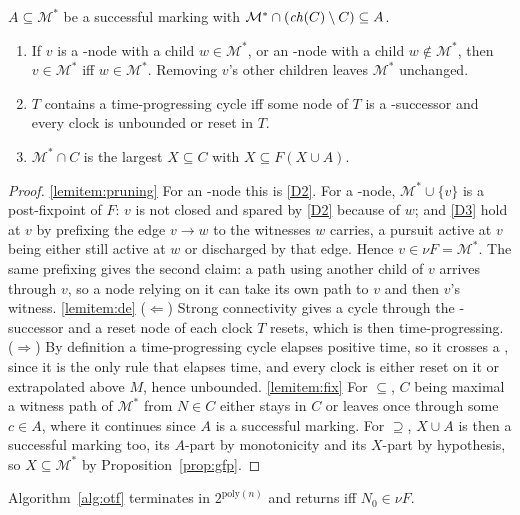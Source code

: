 \begin{lemma}\label{lem:search}
$A\subseteq\mathcal M^{*}$ be a successful marking with $\mathcal M^{*}\cap(\mathit{ch}(C)\setminus C)\subseteq A$.
\begin{enumerate}[label=\emph{(\roman*)}, ref={(\roman*)}]
\item\label{lemitem:pruning} If $v$ is a \ORn-node with a child $w\in\mathcal M^{*}$, or an
\ANDn-node with a child $w\notin\mathcal M^{*}$, then $v\in\mathcal M^{*}$ iff
$w\in\mathcal M^{*}$. Removing $v$'s other children leaves $\mathcal M^{*}$ unchanged.
\item\label{lemitem:de} $T$ contains a time-progressing cycle iff some node of $T$ is a
-successor and every clock is unbounded or reset in $T$.
\item\label{lemitem:fix} $\mathcal M^{*}\cap C$ is the largest $X\subseteq C$ with
$X\subseteq F(X\cup A)$.
\end{enumerate}
\end{lemma}
\begin{proof}
\ref{lemitem:pruning} For an \ANDn-node this is \ref{D2}. For a \ORn-node, $\mathcal M^{*}\cup\{v\}$
is a post-fixpoint of $F$: $v$ is not closed and spared by \ref{D2} because of $w$; and \ref{D3} hold at $v$ by prefixing the edge
$v\to w$ to the witnesses $w$ carries, a pursuit active at $v$ being either still active at $w$ or
discharged by that edge. Hence $v\in\nu F=\mathcal M^{*}$. The same prefixing gives the second
claim: a path using another child of $v$ arrives through $v$, so a node relying on it can take its
own path to $v$ and then $v$'s witness. \ref{lemitem:de} ($\Leftarrow$) Strong connectivity gives a cycle through the
-successor and a reset node of each clock $T$ resets, which is then
time-progressing. ($\Rightarrow$) By definition a time-progressing cycle elapses positive time, so it crosses a , since it is the only rule that elapses time, and every clock is either reset on it or extrapolated above $M$, hence unbounded. 
\ref{lemitem:fix} For $\subseteq$, $C$ being maximal a witness path of $\mathcal M^{*}$ from
$N\in C$ either stays in $C$ or leaves once through some $c\in A$, where it continues since $A$ is a
successful marking. For $\supseteq$, $X\cup A$ is then a successful marking too, its $A$-part by
monotonicity and its $X$-part by hypothesis, so $X\subseteq\mathcal M^{*}$ by
Proposition~\ref{prop:gfp}.
\end{proof}

\begin{theorem}\label{thm:alg}
Algorithm~\ref{alg:otf} terminates in $2^{\mathrm{poly}(n)}$ and returns \SAT{} iff $N_0\in\nu F$.
\end{theorem}



